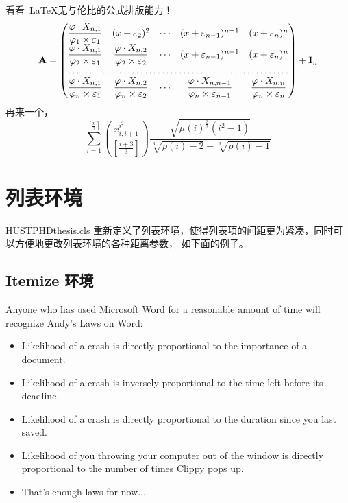 看看~\LaTeX 无与伦比的公式排版能力！
\begin{equation}
\mathbf{A} =
\begin{pmatrix}
\dfrac{\varphi \cdot X_{n, 1}} {\varphi_{1} \times \varepsilon_{1}}
& (x + \varepsilon_{2})^{2} & \cdots & (x + \varepsilon_{n - 1})^{n
- 1}
& (x + \varepsilon_{n})^{n}\\
\dfrac{\varphi \cdot X_{n, 1}} {\varphi_{2} \times \varepsilon_{1}}
& \dfrac{\varphi \cdot X_{n, 2}} {\varphi_{2} \times
\varepsilon_{2}} & \cdots & (x + \varepsilon_{n - 1})^{n - 1}
& (x + \varepsilon_{n})^{n}\\
\hdotsfor{5}\\
\dfrac{\varphi \cdot X_{n, 1}} {\varphi_{n} \times \varepsilon_{1}}
& \dfrac{\varphi \cdot X_{n, 2}} {\varphi_{n} \times
\varepsilon_{2}} & \cdots & \dfrac{\varphi \cdot X_{n, n - 1}}
{\varphi_{n} \times \varepsilon_{n - 1}} & \dfrac{\varphi\cdot X_{n,
n}} {\varphi_{n} \times \varepsilon_{n}}
\end{pmatrix}
+ \mathbf{I}_{n}
\end{equation}
再来一个，
\begin{equation}
\sum_{i=1}^{\left[ \frac{n}{2}\right]} \binom{x_{i,i+1}^{i^2}}
{\left[\frac{i+3}{3} \right]} \frac{\sqrt{\mu(i)^{\frac{3}{2}}
(i^2-1)}} {\sqrt[3]{\rho(i)-2}+\sqrt[3]{\rho(i)-1}}
\end{equation}


\section{列表环境}

HUSTPHDthesis.cls
重新定义了列表环境，使得列表项的间距更为紧凑，同时可以方便地更改列表环境的各种距离参数，
如下面的例子。

\subsection{Itemize 环境}

Anyone who has used Microsoft Word for a reasonable amount of time
will recognize Andy's Laws on Word:
\begin{itemize}
\item Likelihood of a crash is directly proportional to the importance of a document.
\item Likelihood of a crash is inversely proportional to the time left before its deadline.
\item Likelihood of a crash is directly proportional to the duration since you last saved.
\item Likelihood of you throwing your computer out of the window is directly proportional
to the number of times Clippy pops up.
\item That's enough laws for now...
\end{itemize}

